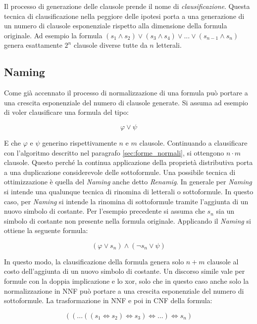 \documentclass[./main.tex]{subfiles}
\begin{document}
Il processo di generazione delle clausole prende il nome di \textit{clausificazione}.
Questa tecnica di clausificazione nella peggiore delle ipotesi porta a una generazione di un numero di clausole esponenziale 
rispetto alla dimensione della formula originale. Ad esempio la formula $(s_1 \land s_2) \lor (s_3 \land s_4) \lor ... \lor (s_{n-1} \land s_{n})$ 
genera esattamente $2^{n}$ clausole diverse tutte da $n$ letterali.



\subsection{Naming} \label{sec:naming}
Come già accennato il processo di normalizzazione di una formula può portare a una crescita esponenziale del numero di clausole generate.
Si assuma ad esempio di voler clausificare una formula del tipo:

$$ \varphi \lor \psi$$

E che $\varphi$ e $\psi$ generino rispettivamente $n$ e $m$ clausole. Continuando a clausificare con l'algoritmo 
descritto nel paragrafo \ref{sec:forme_normali}, si ottengono $n \cdot m$ clausole. 
Questo perché la continua applicazione della proprietà distributiva porta a una duplicazione considerevole delle sottoformule.
Una possibile tecnica di ottimizzazione è quella del \textit{Naming} \cite{naming} anche detto \textit{Renamig}.
In generale per \textit{Naming} si intende una qualunque tecnica di rinomina di letterali o sottoformule.
In questo caso, per \textit{Naming} si intende la rinomina di sottoformule tramite l'aggiunta di un nuovo simbolo di costante.
Per l'esempio precedente si assuma che $s_n$ sia un simbolo di costante non presente nella formula originale.
Applicando il \textit{Naming} si ottiene la seguente formula:

$$ (\varphi \lor s_n) \land (\lnot s_n \lor \psi)$$

In questo modo, la clausificazione della formula genera solo $n + m$ clausole al costo dell'aggiunta di un nuovo simbolo di costante.
Un discorso simile vale per formule con la doppia implicazione e lo xor, solo che in questo caso
anche solo la normalizzazione in NNF può portare a una crescita esponenziale del numero di sottoformule.
La trasformazione in NNF e poi in CNF della formula:

$$ ((...((s_1 \Leftrightarrow s_2) \Leftrightarrow s_3) \Leftrightarrow ...) \Leftrightarrow s_n)$$
\end{document}
